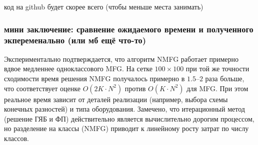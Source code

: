 код на github будет скорее всего (чтобы меньше места занимать)

\subsubsection{мини заключение: сравнение ожидаемого времени и полученного экпеременально (или мб ещё что-то)}

Экспериментально подтверждается, что алгоритм NMFG работает примерно вдвое медленнее одноклассового MFG. На сетке $100 \times 100$ при той же точности сходимости время решения NMFG получалось примерно в $1.5\text{--}2$ раза больше, что соответствует оценке $O(2K \cdot N^2)$ против $O(K \cdot N^2)$ для MFG. При этом реальное время зависит от деталей реализации (например, выбора схемы конечных разностей) и типа оборудования. Замечено, что итерационный метод (решение ГЯБ и ФП) действительно является вычислительно дорогим процессом, но разделение на классы (NMFG) приводит к линейному росту затрат по числу классов.
